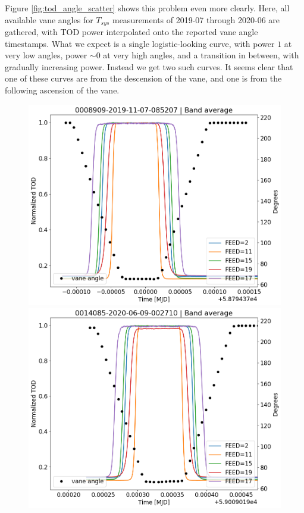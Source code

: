 \documentclass[10pt, a4paper]{article}
\begin{document}
Figure \ref{fig:tod_angle_scatter} shows this problem even more clearly. Here, all available vane angles for $T_{sys}$ measurements of 2019-07 through 2020-06 are gathered, with TOD power interpolated onto the reported vane angle timestamps. What we expect is a single logistic-looking curve, with power $1$ at very low angles, power $\sim 0$ at very high angles, and a transition in between, with gradually increasing power. Instead we get two such curves. It seems clear that one of these curves are from the descension of the vane, and one is from the following ascension of the vane. 

\begin{figure}[H]
    \centering
    \includegraphics[scale=0.34]{../plots/tod_angle_0008909-2019-11-07-085207.png}
    \includegraphics[scale=0.34]{../plots/tod_angle_0014085-2020-06-09-002710.png}

\end{figure}
\end{document}
